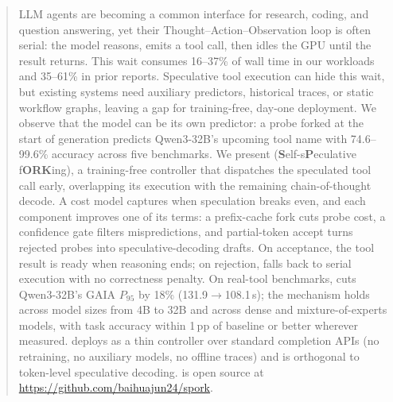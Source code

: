 \begin{abstract}
LLM agents are becoming a common interface for research, coding, and question
answering, yet their Thought--Action--Observation loop is often serial: the
model reasons, emits a tool call, then idles the GPU until the result returns.
This wait consumes 16--37\% of wall time in our workloads and 35--61\% in
prior reports.
Speculative tool execution can hide this wait, but existing systems need
auxiliary predictors, historical traces, or static workflow graphs, leaving a
gap for training-free, day-one deployment.
We observe that the model can be its own predictor: a probe forked at the
start of generation predicts Qwen3-32B's upcoming tool name with
74.6--99.6\% accuracy across five benchmarks.
We present \spork{} (\textbf{S}elf-s\textbf{P}eculative f\textbf{ORK}ing), a
training-free controller that dispatches the speculated tool call early,
overlapping its execution with the remaining chain-of-thought decode.
A cost model captures when speculation breaks even, and each component improves
one of its terms: a prefix-cache fork cuts probe cost, a confidence gate filters
mispredictions, and partial-token accept turns rejected probes into
speculative-decoding drafts.
On acceptance, the tool result is ready when reasoning ends; on rejection,
\spork{} falls back to serial execution with no correctness penalty.
On real-tool benchmarks, \spork{} cuts Qwen3-32B's GAIA $P_{95}$ by 18\%
(131.9$\to$108.1\,s); the mechanism holds across model sizes from 4B to 32B and
across dense and mixture-of-experts models, with task accuracy within 1\,pp of
baseline or better wherever measured.
\spork{} deploys as a thin controller over standard completion APIs (no
retraining, no auxiliary models, no offline traces) and is orthogonal to
token-level speculative decoding.
\spork{} is open source at \url{https://github.com/baihuajun24/spork}.
\end{abstract}
